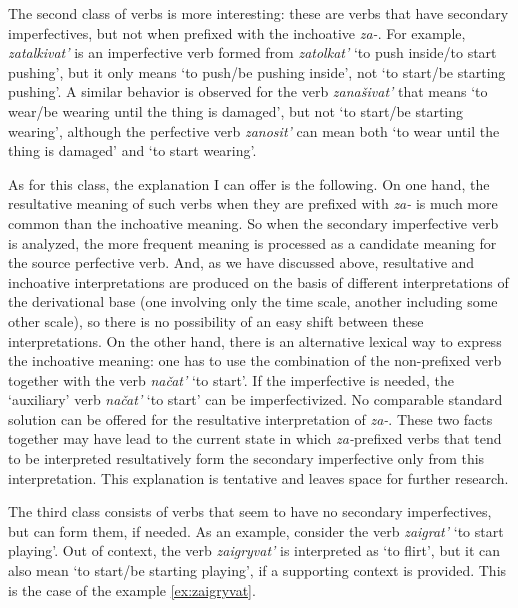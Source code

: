 The second class of verbs is more interesting: these are verbs that have secondary imperfectives, but not when prefixed with the inchoative \textit{za-}. For example, \textit{zatalkivat'} is an imperfective verb formed from \textit{zatolkat'} `to push inside/to start pushing', but it only means `to push/be pushing inside', not `to start/be starting pushing'. A similar behavior is observed for the verb \textit{zana\v{s}ivat'} that means `to wear/be wearing until the thing is damaged', but not `to start/be starting wearing', although the perfective verb \textit{zanosit'} can mean both `to wear until the thing is damaged' and `to start wearing'.

As for this class, the explanation I can offer is the following. On one hand, the resultative meaning of such verbs when they are prefixed with \textit{za-} is much more common than the inchoative meaning. So when the secondary imperfective verb is analyzed, the more frequent meaning is processed as a candidate meaning for the source perfective verb. And, as we have discussed above, resultative and inchoative interpretations are produced on the basis of different interpretations of the derivational base (one involving only the time scale, another including some other scale), so there is no possibility of an easy shift between these interpretations. On the other hand, there is an alternative lexical way to express the inchoative meaning: one has to use the combination of the non-prefixed verb together with the verb \textit{na\v{c}at'} `to start'. If the imperfective is needed, the `auxiliary' verb \textit{na\v{c}at'} `to start' can be imperfectivized. No comparable standard solution can be offered for the resultative interpretation of \textit{za-}. These two facts together may have lead to the current state in which \textit{za-}prefixed verbs that tend to be interpreted resultatively form the secondary imperfective only from this interpretation. This explanation is tentative and leaves space for further research.

The third class consists of verbs that seem to have no secondary imperfectives, but can form them, if needed. As an example, consider the verb \textit{zaigrat'} `to start playing'. Out of context, the verb \textit{zaigryvat'} is interpreted as `to flirt', but it can also mean `to start/be starting playing', if a supporting context is provided. This is the case of the example \ref{ex:zaigryvat}. 


